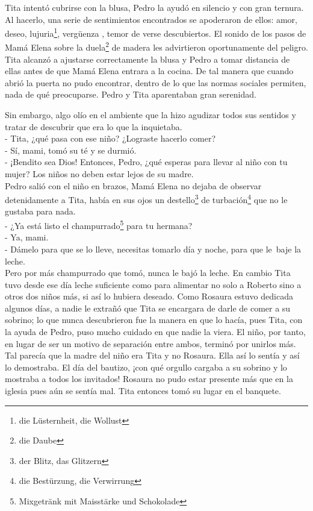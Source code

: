 Tita intentó cubrirse con la blusa, Pedro la ayudó en silencio y con
gran ternura. Al hacerlo, una serie de sentimientos encontrados se
apoderaron de ellos: amor, deseo, lujuria\footnote{die Lüsternheit, die Wollust},
vergüenza \ndots, temor de verse descubiertos. El sonido de los pasos
de Mamá Elena sobre la duela\footnote{die Daube} de madera les
advirtieron oportunamente del peligro. Tita alcanzó a ajustarse correctamente
la blusa y Pedro a tomar distancia de ellas antes de que Mamá Elena entrara
a la cocina. De tal manera que cuando abrió la puerta no pudo encontrar,
dentro de lo que las normas sociales permiten, nada de qué preocuparse.
Pedro y Tita aparentaban gran serenidad.

Sin embargo, algo olío en el ambiente que la hizo agudizar todos sus
sentidos y tratar de descubrir que era lo que la inquietaba.
\\- Tita, ¿qué pasa con ese niño? ¿Lograste hacerlo comer? %
\\- Sí, mami, tomó su té y se durmió. %
\\- ¡Bendito sea Dios! Entonces, Pedro, ¿qué esperas para llevar al niño %
con tu mujer? Los niños no deben estar lejos de su madre.\\

Pedro salió con el niño en brazos, Mamá Elena no dejaba de observar
detenidamente a Tita, había en sus ojos un destello\footnote{der Blitz, das Glitzern}
de turbación\footnote{die Bestürzung, die Verwirrung} que no
le gustaba para nada.
\\- ¿Ya está listo el champurrado\footnote{Mixgetränk mit Maisstärke und Schokolade} %
para tu hermana? %
\\- Ya, mami. %
\\- Dámelo para que se lo lleve, necesitas tomarlo día y noche, para que %
le~baje la leche.\\

Pero por más champurrado que tomó, nunca le bajó la leche. En cambio
Tita tuvo desde ese día leche suficiente como para alimentar no solo a
Roberto sino a otros dos niños más, si así lo hubiera deseado. Como
Rosaura estuvo dedicada algunos días, a nadie le extrañó que Tita se
encargara de darle de comer a su sobrino; lo que nunca descubrieron fue
la manera en que lo hacía, pues Tita, con la ayuda de Pedro, puso mucho
cuidado en que nadie la viera.
El niño, por tanto, en lugar de ser un motivo de separación entre ambos,
terminó por unirlos más. Tal parecía que la madre del niño era Tita y
no Rosaura. Ella así lo sentía y así lo demostraba. El día del bautizo,
¡con qué orgullo cargaba a su sobrino y lo mostraba a todos los
invitados! Rosaura no pudo estar presente más que en la iglesia pues aún
se sentía mal. Tita entonces tomó su lugar en el banquete.

